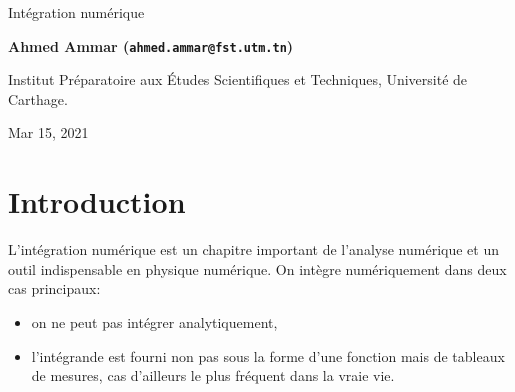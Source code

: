 \documentclass[%
oneside,                 %
final,                   %
10pt]{article}
\begin{document}

\newcommand{\exercisesection}[1]{\subsection*{#1}}






\thispagestyle{empty}

\begin{center}
{\LARGE\bf
\begin{spacing}{1.25}
Intégration numérique
\end{spacing}
}
\end{center}


\begin{center}
{\bf Ahmed Ammar (\texttt{ahmed.ammar@fst.utm.tn})}
\end{center}

    \begin{center}
\centerline{{\small Institut Préparatoire aux Études Scientifiques et Techniques, Université de Carthage.}}
\end{center}
    

\begin{center}
Mar 15, 2021
\end{center}

\vspace{1cm}


\tableofcontents


\vspace{1cm} %




\section{Introduction}
L'intégration numérique est un chapitre important de l'analyse numérique et un outil indispensable en physique numérique. On intègre numériquement dans deux cas principaux:

\begin{itemize}
\item on ne peut pas intégrer analytiquement,

\item l'intégrande est fourni non pas sous la forme d'une fonction mais de tableaux de mesures, cas d'ailleurs le plus fréquent dans la vraie vie.
\end{itemize}
\end{document}
